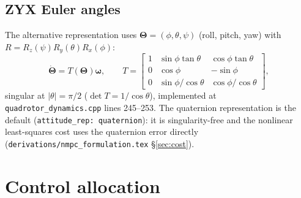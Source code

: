 \documentclass[11pt]{article}
\begin{document}
\subsection{ZYX Euler angles}

The alternative representation uses $\bm\Theta = (\phi, \theta, \psi)$ (roll, pitch, yaw)
with $R = R_z(\psi) R_y(\theta) R_x(\phi)$:
\begin{equation}
  \dot{\bm\Theta} = T(\bm\Theta) \bm\omega, \qquad
  T = \begin{bmatrix}
    1 & \sin\phi\tan\theta & \cos\phi\tan\theta \\
    0 & \cos\phi & -\sin\phi \\
    0 & \sin\phi/\cos\theta & \cos\phi/\cos\theta
  \end{bmatrix},
  \label{eq:eulerT}
\end{equation}
singular at $|\theta| = \pi/2$ ($\det T = 1/\cos\theta$), implemented at
\texttt{quadrotor\_dynamics.cpp} lines 245--253. The quaternion representation is the default
(\texttt{attitude\_rep: quaternion}): it is singularity-free and the nonlinear least-squares
cost uses the quaternion error directly (\texttt{derivations/nmpc\_formulation.tex}
\S\ref{sec:cost}).

\section{Control allocation}
\label{sec:allocation}
\end{document}
